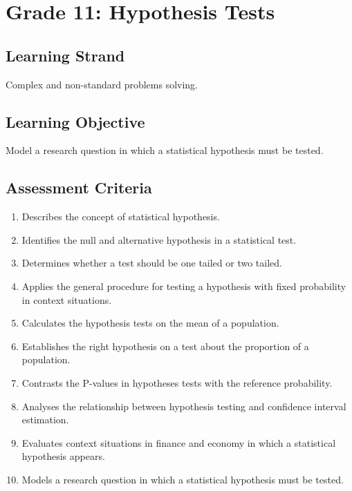 \section{Grade 11: Hypothesis Tests}\label{sec:grade11-term3-overview}

\subsection{Learning Strand}\label{sec:grade11-term3-strand}

Complex and non-standard problems solving.

\subsection{Learning Objective}\label{sec:grade11-term3-objective}

Model a research question in which a statistical hypothesis must be tested.

\subsection{Assessment Criteria}\label{sec:grade11-term3-criteria}

\begin{enumerate}
	\item Describes the concept of statistical hypothesis.
	\item Identifies the null and alternative hypothesis in a statistical test.
	\item Determines whether a test should be one tailed or two tailed.
	\item Applies the general procedure for testing a hypothesis with fixed probability in context situations.
	\item Calculates the hypothesis tests on the mean of a population.
	\item Establishes the right hypothesis on a test about the proportion of a population.
	\item Contrasts the P-values in hypotheses tests with the reference probability.
	\item Analyses the relationship between hypothesis testing and confidence interval estimation.
	\item Evaluates context situations in finance and economy in which a statistical hypothesis appears.
	\item Models a research question in which a statistical hypothesis must be tested.
\end{enumerate}

